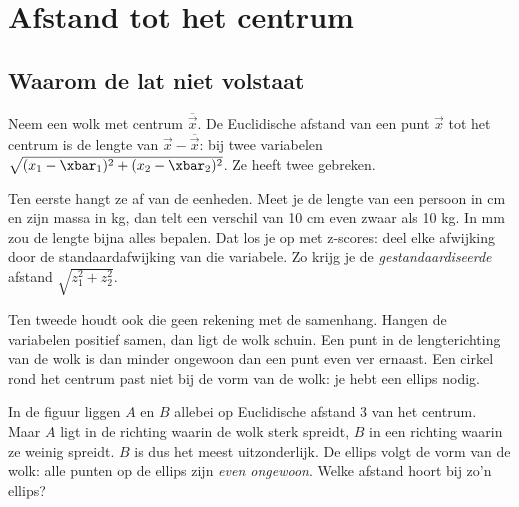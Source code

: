 \section{Afstand tot het centrum}

\subsection{Waarom de lat niet volstaat}

Neem een wolk met centrum $\overline{\vec x}$. De Euclidische afstand van een punt $\vec x$ tot het centrum is de lengte van $\vec x - \overline{\vec x}$: bij twee variabelen $\sqrt{(x_1 - \xbar_1)^2 + (x_2 - \xbar_2)^2}$. Ze heeft twee gebreken.

Ten eerste hangt ze af van de eenheden. Meet je de lengte van een persoon in cm en zijn massa in kg, dan telt een verschil van 10 cm even zwaar als 10 kg. In mm zou de lengte bijna alles bepalen. Dat los je op met z-scores: deel elke afwijking door de standaardafwijking van die variabele. Zo krijg je de \textit{gestandaardiseerde} afstand $\sqrt{z_1^2 + z_2^2}$.

Ten tweede houdt ook die geen rekening met de samenhang. Hangen de variabelen positief samen, dan ligt de wolk schuin. Een punt in de lengterichting van de wolk is dan minder ongewoon dan een punt even ver ernaast. Een cirkel rond het centrum past niet bij de vorm van de wolk: je hebt een ellips nodig.


In de figuur liggen $A$ en $B$ allebei op Euclidische afstand 3 van het centrum. Maar $A$ ligt in de richting waarin de wolk sterk spreidt, $B$ in een richting waarin ze weinig spreidt. $B$ is dus het meest uitzonderlijk. De ellips volgt de vorm van de wolk: alle punten op de ellips zijn \textit{even ongewoon}. Welke afstand hoort bij zo'n ellips?

